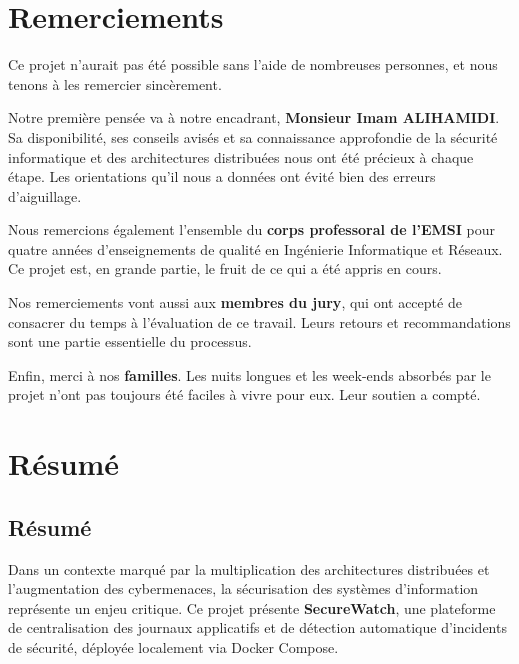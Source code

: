 \documentclass[12pt, a4paper]{report}
\begin{document}
\clearpage

\chapter*{Remerciements}
\thispagestyle{empty}

Ce projet n'aurait pas été possible sans l'aide de nombreuses personnes, et nous tenons à les remercier sincèrement.

Notre première pensée va à notre encadrant, \textbf{Monsieur Imam ALIHAMIDI}. Sa disponibilité, ses conseils avisés et sa connaissance approfondie de la sécurité informatique et des architectures distribuées nous ont été précieux à chaque étape. Les orientations qu'il nous a données ont évité bien des erreurs d'aiguillage.

Nous remercions également l'ensemble du \textbf{corps professoral de l'EMSI} pour quatre années d'enseignements de qualité en Ingénierie Informatique et Réseaux. Ce projet est, en grande partie, le fruit de ce qui a été appris en cours.

Nos remerciements vont aussi aux \textbf{membres du jury}, qui ont accepté de consacrer du temps à l'évaluation de ce travail. Leurs retours et recommandations sont une partie essentielle du processus.

Enfin, merci à nos \textbf{familles}. Les nuits longues et les week-ends absorbés par le projet n'ont pas toujours été faciles à vivre pour eux. Leur soutien a compté.

\clearpage

\chapter*{Résumé}

\section*{Résumé}

Dans un contexte marqué par la multiplication des architectures distribuées et l'augmentation des cybermenaces, la sécurisation des systèmes d'information représente un enjeu critique. Ce projet présente \textbf{SecureWatch}, une plateforme de centralisation des journaux applicatifs et de détection automatique d'incidents de sécurité, déployée localement via Docker Compose.
\end{document}
